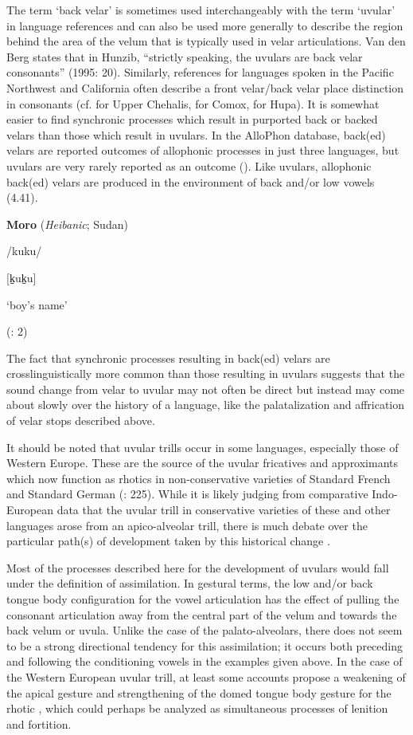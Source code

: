   The term ‘back velar’ is sometimes used interchangeably with the term ‘uvular’ in language references and can also be used more generally to describe the region behind the area of the velum that is typically used in velar articulations. Van den Berg states that in Hunzib, “strictly speaking, the uvulars are back velar consonants” (1995: 20). Similarly, references for languages spoken in the Pacific Northwest and California often describe a front velar/back velar place distinction in consonants (cf. \citealt{Kinkade1963} for Upper Chehalis, \citealt{Harris1981} for Comox, \citealt{Golla1970} for Hupa). It is somewhat easier to find synchronic processes which result in purported back or backed velars than those which result in uvulars. In the AlloPhon database, back(ed) velars are reported outcomes of allophonic processes in just three languages, but uvulars are very rarely reported as an outcome (\citealt{BybeeEasterday2019}). Like uvulars, allophonic back(ed) velars are produced in the environment of back and/or low vowels (4.41).

\ea\label{ex:(4.41)}
  \textbf{Moro} (\textit{Heibanic}; Sudan)

/kuku/

[k̠uk̠u]

‘boy’s name’

(\citealt{BlackBlack1971}: 2)

\z

  The fact that synchronic processes resulting in back(ed) velars are crosslinguistically more common than those resulting in uvulars suggests that the sound change from velar to uvular may not often be direct but instead may come about slowly over the history of a language, like the palatalization and affrication of velar stops described above.

  It should be noted that uvular trills occur in some languages, especially those of Western Europe. These are the source of the uvular fricatives and approximants which now function as rhotics in non-conservative varieties of Standard French and Standard German (\citealt{LadefogedMaddieson1996}: 225). While it is likely judging from comparative Indo-European data that the uvular trill in conservative varieties of these and other languages arose from an apico-alveolar trill, there is much debate over the particular path(s) of development taken by this historical change \citep{Schiller1999}.

  Most of the processes described here for the development of uvulars would fall under the definition of assimilation. In gestural terms, the low and/or back tongue body configuration for the vowel articulation has the effect of pulling the consonant articulation away from the central part of the velum and towards the back velum or uvula. Unlike the case of the palato-alveolars, there does not seem to be a strong directional tendency for this assimilation; it occurs both preceding and following the conditioning vowels in the examples given above. In the case of the Western European uvular trill, at least some accounts propose a weakening of the apical gesture and strengthening of the domed tongue body gesture for the rhotic \citep{Schiller1999}, which could perhaps be analyzed as simultaneous processes of lenition and fortition.

